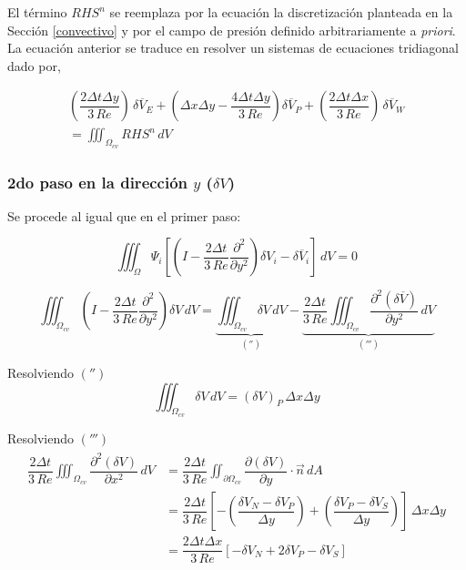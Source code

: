 El término $RHS^n$ se reemplaza por la ecuación la discretización planteada en la Sección \ref{convectivo} y por el campo de presión definido arbitrariamente a \textit{priori}. La ecuación anterior se traduce en resolver un sistemas de ecuaciones tridiagonal dado por,

\begin{equation}
\begin{split}
\left( \dfrac{2 \Delta t \Delta y}{3 \, Re} \right) \, \delta \overline{V}_E + \left( \Delta x \Delta y - \dfrac{4 \Delta t \Delta y}{3 \, Re} \right) \delta \overline{V}_P + \left( \dfrac{2 \Delta t \Delta x}{3 \, Re} \right) \, \delta \overline{V}_W \\
= \iiint_{\Omega_{cv}} RHS^n \, dV
\end{split}
\end{equation}

\subsubsection{2do paso en la dirección $y$ ($\delta V$)}

Se procede al igual que en el primer paso: 

\begin{equation} \label{segundo_paso}
\iiint_{\Omega} \Psi_i \left[ \left( I - \dfrac{2 \Delta t}{3 \, Re}  \dfrac{\partial^2}{\partial y^2} \right) \delta V_i - \delta \overline{V}_i \right] \, dV = 0
\end{equation}

\begin{equation}
\iiint_{\Omega_{cv}} \left( I - \dfrac{2 \Delta t}{3 \, Re}  \dfrac{\partial^2}{\partial y^2} \right) \delta V \, dV =  \underbrace{\iiint_{\Omega_{cv}} \delta V \, dV}_{('')}  - \underbrace{\dfrac{2 \Delta t}{3 \, Re} \iiint_{\Omega_{cv}}  \dfrac{\partial^2 (\delta \overline{V}) }{\partial y^2} \, dV}_{(''')}
\end{equation}

Resolviendo $('')$
\begin{equation}
\iiint_{\Omega_{cv}} \delta V \, dV =  (\delta V)_P \, \Delta x \Delta y
\end{equation}

Resolviendo $(''')$
\begin{align*}
\begin{split}
\dfrac{2 \Delta t}{3 \, Re} \iiint_{\Omega_{cv}}  \dfrac{\partial^2 (\delta V) }{\partial x^2} \, dV &= \dfrac{2 \Delta t}{3 \, Re} \iint_{\partial \Omega_{cv}} \dfrac{\partial (\delta V)}{\partial y} \cdot \vec{n} \, dA \\
&= \dfrac{2 \Delta t}{3 \, Re} \left[ -\left(\dfrac{\delta V_N - \delta V_P}{\Delta y} \right) + \left( \dfrac{\delta V_P-\delta V_S}{\Delta y} \right) \right] \, \Delta x \Delta y \\
&= \dfrac{2 \Delta t \Delta x}{3 \, Re} \left[ -\delta V_N + 2 \delta V_P - \delta V_S \right]
\end{split}
\end{align*}

